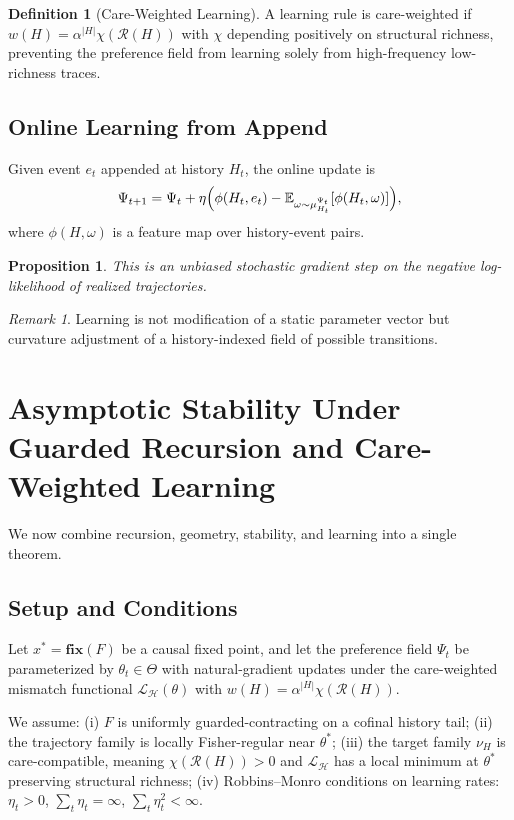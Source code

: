 \documentclass[11pt,a4paper]{article}
\newtheorem{proposition}[theorem]{Proposition}
\theoremstyle{definition}
\newtheorem{definition}[theorem]{Definition}
\theoremstyle{remark}
\newtheorem{remark}[theorem]{Remark}
\begin{document}
\begin{definition}[Care-Weighted Learning]
A learning rule is care-weighted if $w(H) = \alpha^{|H|} \chi(\mathcal{R}(H))$ with $\chi$ depending positively on structural richness, preventing the preference field from learning solely from high-frequency low-richness traces.
\end{definition}

\subsection{Online Learning from Append}

Given event $e_t$ appended at history $H_t$, the online update is
\[
\Psi_{t+1} = \Psi_t + \eta\Bigl(\phi(H_t, e_t) - \mathbb{E}_{\omega \sim \mu_{H_t}^{\Psi_t}}[\phi(H_t, \omega)]\Bigr),
\]
where $\phi(H,\omega)$ is a feature map over history-event pairs.

\begin{proposition}
This is an unbiased stochastic gradient step on the negative log-likelihood of realized trajectories.
\end{proposition}

\begin{remark}
Learning is not modification of a static parameter vector but curvature adjustment of a history-indexed field of possible transitions.
\end{remark}

\section{Asymptotic Stability Under Guarded Recursion and Care-Weighted Learning}

We now combine recursion, geometry, stability, and learning into a single theorem.

\subsection{Setup and Conditions}

Let $x^\ast = \mathbf{fix}(F)$ be a causal fixed point, and let the preference field $\Psi_t$ be parameterized by $\theta_t \in \Theta$ with natural-gradient updates under the care-weighted mismatch functional $\mathcal{L}_{\mathcal{H}}(\theta)$ with $w(H) = \alpha^{|H|}\chi(\mathcal{R}(H))$.

We assume: (i) $F$ is uniformly guarded-contracting on a cofinal history tail; (ii) the trajectory family is locally Fisher-regular near $\theta^\ast$; (iii) the target family $\nu_H$ is care-compatible, meaning $\chi(\mathcal{R}(H)) > 0$ and $\mathcal{L}_{\mathcal{H}}$ has a local minimum at $\theta^\ast$ preserving structural richness; (iv) Robbins--Monro conditions on learning rates: $\eta_t > 0$, $\sum_t \eta_t = \infty$, $\sum_t \eta_t^2 < \infty$.
\end{document}
